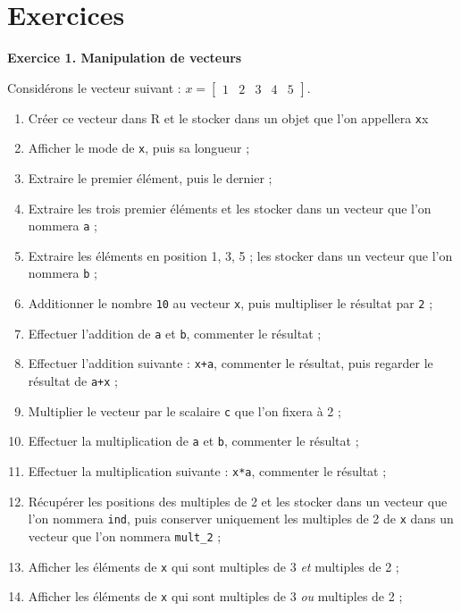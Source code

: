 \documentclass[
  11pt,
]{book}
\makeatletter
\providecommand{\tightlist}{%
  \setlength{\itemsep}{0pt}\setlength{\parskip}{0pt}}
\numberwithin{equation}{section}
\numberwithin{countremarque}{section}
\newcounter{exercices}[section]
\newenvironment{exframe}{%
 \def\at@end@of@exframe{}%
 \ifinner\ifhmode%
  \def\at@end@of@exframe{\end{minipage}}%
  \begin{minipage}{\columnwidth}%
 \fi\fi%
 \def\FrameCommand##1{\hskip\@totalleftmargin \hskip-\fboxsep
 \colorbox{shadecolorex}{##1}\hskip-\fboxsep
     \hskip-\linewidth \hskip-\@totalleftmargin \hskip\columnwidth}%
 \MakeFramed {\advance\hsize-\width
   \@totalleftmargin\z@ \linewidth\hsize
   \@setminipage}}%
 {\par\unskip\endMakeFramed%
 \at@end@of@exframe}
\makeatother
\begin{document}
\hypertarget{exercices}{%
\section{Exercices}\label{exercices}}

\begin{exframe}
\textbf{Exercice 1. Manipulation de vecteurs}

Considérons le vecteur suivant : \(x = \begin{bmatrix}1 & 2 & 3 & 4 & 5\end{bmatrix}\).

\begin{enumerate}
\def\labelenumi{\arabic{enumi}.}
\tightlist
\item
  Créer ce vecteur dans R et le stocker dans un objet que l'on appellera \texttt{x}x
\item
  Afficher le mode de \texttt{x}, puis sa longueur ;
\item
  Extraire le premier élément, puis le dernier ;
\item
  Extraire les trois premier éléments et les stocker dans un vecteur que l'on nommera \texttt{a} ;
\item
  Extraire les éléments en position 1, 3, 5 ; les stocker dans un vecteur que l'on nommera \texttt{b} ;
\item
  Additionner le nombre \texttt{10} au vecteur \texttt{x}, puis multipliser le résultat par \texttt{2} ;
\item
  Effectuer l'addition de \texttt{a} et \texttt{b}, commenter le résultat ;
\item
  Effectuer l'addition suivante : \texttt{x+a}, commenter le résultat, puis regarder le résultat de \texttt{a+x} ;
\item
  Multiplier le vecteur par le scalaire \texttt{c} que l'on fixera à 2 ;
\item
  Effectuer la multiplication de \texttt{a} et \texttt{b}, commenter le résultat ;
\item
  Effectuer la multiplication suivante : \texttt{x*a}, commenter le résultat ;
\item
  Récupérer les positions des multiples de 2 et les stocker dans un vecteur que l'on nommera \texttt{ind}, puis conserver uniquement les multiples de 2 de \texttt{x} dans un vecteur que l'on nommera \texttt{mult\_2} ;
\item
  Afficher les éléments de \texttt{x} qui sont multiples de 3 \emph{et} multiples de 2 ;
\item
  Afficher les éléments de \texttt{x} qui sont multiples de 3 \emph{ou} multiples de 2 ;

\end{enumerate}
\end{exframe}
\end{document}
